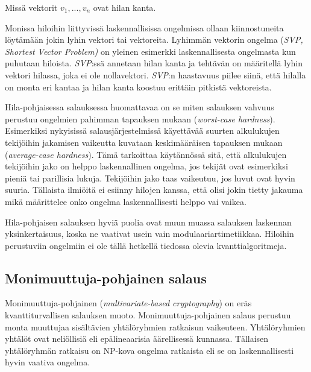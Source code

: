 Missä vektorit $v_1,...,v_n$ ovat hilan kanta.

Monissa hiloihin liittyvissä 
laskennallisissa ongelmissa ollaan kiinnostuneita löytämään jokin lyhin vektori tai vektoreita. Lyhimmän vektorin ongelma (\emph{SVP, Shortest Vector Problem)} on yleinen esimerkki laskennallisesta ongelmasta kun puhutaan hiloista. \emph{SVP}:ssä annetaan hilan kanta ja tehtävän on määritellä lyhin vektori hilassa, joka ei ole nollavektori. \emph{SVP}:n haastavuus piilee siinä, että hilalla on monta eri kantaa ja hilan kanta koostuu erittäin pitkistä vektoreista.

Hila-pohjaisessa salauksessa huomattavaa on se miten salauksen vahvuus perustuu ongelmien pahimman tapauksen mukaan (\emph{worst-case hardness}). Esimerkiksi nykyisissä salausjärjestelmissä käyettävää suurten alkulukujen tekijöihin jakamisen vaikeutta kuvataan keskimääräisen tapauksen mukaan (\emph{average-case hardness}). Tämä tarkoittaa käytännössä sitä, että alkulukujen tekijöihin jako on helppo laskennallinen ongelma, jos tekijät ovat esimerkiksi pieniä tai parillisia lukuja. Tekijöihin jako taas vaikeutuu, jos luvut ovat hyvin suuria. Tällaista ilmiöitä ei esiinny hilojen kanssa, että olisi jokin tietty jakauma mikä määrittelee onko ongelma laskennallisesti helppo vai vaikea.

Hila-pohjaisen salauksen hyviä puolia ovat muun muassa salauksen laskennan yksinkertaisuus, koska ne vaativat usein vain modulaariartimetiikkaa. Hiloihin perustuviin ongelmiin ei ole tällä hetkellä tiedossa olevia kvanttialgoritmeja.

\subsection{Monimuuttuja-pohjainen salaus}
Monimuuttuja-pohjainen (\emph{multivariate-based cryptography}) on eräs kvanttiturvallisen salauksen muoto. Monimuuttuja-pohjainen salaus perustuu monta muuttujaa sisältävien yhtälöryhmien ratkaisun vaikeuteen. Yhtälöryhmien yhtälöt ovat neliöllisiä eli epälineaarisia äärellisessä kunnassa. Tällaisen yhtälöryhmän ratkaisu on NP-kova ongelma ratkaista eli se on laskennallisesti hyvin vaativa ongelma.